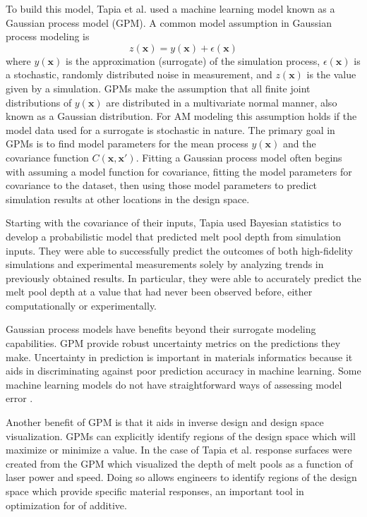 To build this model, Tapia et al. used a machine learning model known as a Gaussian process model (GPM). A common model assumption in Gaussian process modeling is
\begin{equation}
	z(\mathbf{x}) = y(\mathbf{x}) + \epsilon(\mathbf{x})
	\label{model}
\end{equation}
where $y(\mathbf{x})$ is the approximation (surrogate) of the simulation process, $\epsilon(\mathbf{x})$ is a stochastic, randomly distributed noise in measurement, and $z(\mathbf{x})$ is the value given by a simulation. GPMs make the assumption that all finite joint distributions of $y(\mathbf{x})$ are distributed in a multivariate normal manner, also known as a Gaussian distribution. For AM modeling this assumption holds if the model data used for a surrogate is stochastic in nature. The primary goal in GPMs is to find model parameters for the mean process $y(\mathbf{x})$ and the covariance function $C(\mathbf{x},\mathbf{x}')$. Fitting a Gaussian process model often begins with assuming a model function for covariance, fitting the model parameters for covariance to the dataset, then using those model parameters to predict simulation results at other locations in the design space. 

Starting with the covariance of their inputs, Tapia used Bayesian statistics to develop a probabilistic model that predicted melt pool depth from simulation inputs. They were able to successfully predict the outcomes of both high-fidelity simulations and experimental measurements solely by analyzing trends in previously obtained results. In particular, they were able to accurately predict the melt pool depth at a value that had never been observed before, either computationally or experimentally. 

Gaussian process models have benefits beyond their surrogate modeling capabilities. GPM provide robust uncertainty metrics on the predictions they make. Uncertainty in prediction is important in materials informatics because it aids in discriminating against poor prediction accuracy in machine learning. Some machine learning models do not have straightforward ways of assessing model error \cite{Bessa2017}. 

Another benefit of GPM is that it aids in inverse design and design space visualization. GPMs can explicitly identify regions of the design space which will maximize or minimize a value. In the case of Tapia et al. response surfaces were created from the GPM which visualized the depth of melt pools as a function of laser power and speed. Doing so allows engineers to identify regions of the design space which provide specific material responses, an important tool in optimization for of additive.

